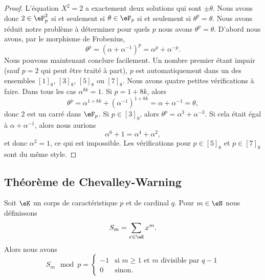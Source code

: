 \begin{proof}
	L'équation \( X^2=2\) a exactement deux solutions qui sont \( \pm\theta\). Nous avons donc \( 2\in \eF_p^2\) si et seulement si \( \theta\in \eF_p\) si et seulement si \( \theta^p=\theta\). Nous avons réduit notre problème à déterminer pour quels \( p\) nous avons \( \theta^p=\theta\). D'abord nous avons, par le morphisme de Frobenius,
	\begin{equation}
		\theta^p=(\alpha+\alpha^{-1})^p=\alpha^p+\alpha^{-p}.
	\end{equation}
	Nous pouvons maintenant conclure facilement. Un nombre premier étant impair (sauf \( p=2\) qui peut être traité à part), \( p\) est automatiquement dans un des ensembles \( [1]_8\), \( [3]_8\), \( [5]_8\) ou \( [7]_8\). Nous avons quatre petites vérifications à faire. Dans tous les cas \( \alpha^{8k}=1\). Si \( p=1+8k\), alors
	\begin{equation}
		\theta^p=\alpha^{1+8k}+(\alpha^{-1})^{1+8k}=\alpha+\alpha^{-1}=\theta,
	\end{equation}
	donc \( 2\) est un carré dans \( \eF_p\). Si \( p\in[3]_8\), alors \( \theta^p=\alpha^3+\alpha^{-3}\). Si cela était égal à \( \alpha+\alpha^{-1}\), alors nous aurions
	\begin{equation}
		\alpha^6+1=\alpha^4+\alpha^2,
	\end{equation}
	et donc \( \alpha^2=1\), ce qui est impossible. Les vérifications pour \( p\in [5]_8\) et \( p\in [7]_8\) sont du même style.
\end{proof}

\subsection{Théorème de Chevalley-Warning}

\begin{lemma}
	Soit \( \eK\) un corps de caractéristique \( p\) et de cardinal \( q\). Pour \( m\in \eN\) nous définissons
	\begin{equation}
		S_m=\sum_{x\in \eK}x^m.
	\end{equation}
	Alors nous avons
	\begin{equation}
		S_m\mod p=\begin{cases}
			-1 & \text{si } m\geq 1\text{ et } m\text{ divisible par } q-1 \\
			0  & \text{sinon}.
		\end{cases}
	\end{equation}
\end{lemma}

